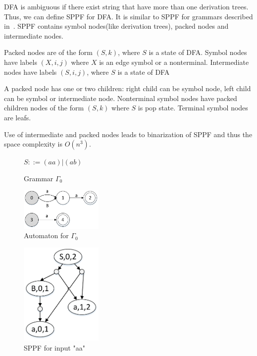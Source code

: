 \documentclass[runningheads,a4paper]{llncs}
\begin{document}
DFA is ambiguous if there exist string that have more than one derivation trees. Thus, we can define SPPF for DFA. 
It is similar to SPPF for grammars described in~\cite{scott2013gll}. SPPF contains symbol nodes(like derivation trees), packed nodes
and intermediate nodes. 

Packed nodes are of the form $(S, k)$, where $S$ is a state of DFA. 
Symbol nodes have labels $(X, i, j)$ where $X$ is an edge symbol or a nonterminal. 
Intermediate nodes have labels $ (S, i, j) $, where $S$ is a state of DFA

A packed node has one or two children: right child can be symbol node, left child can be symbol or intermediate node.   
Nonterminal symbol nodes have packed children nodes of the form $(S, k)$ where $S$ is pop state. 
Terminal symbol nodes are leafs.

Use of intermediate and packed nodes leads to binarization of SPPF and thus the space complexity is $O(n^{3})$.

\begin{figure}
    \centering
    \parbox{2.9cm}{
        \begin{center}
            $S ::= (aa)|(ab)$
        \end{center}
        \caption{Grammar $\Gamma_{0}$}
        \label{fig:grammarG0}}
    \qquad
    \begin{minipage}{4cm}
        \includegraphics[width=4cm]{pictures/automatonForG0.pdf}
        \caption{Automaton for $\Gamma_{0}$}
        \label{fig:automatonForG0}
    \end{minipage}
\end{figure}

\begin{figure}
    \centering
    \includegraphics[width=4cm]{pictures/SPPFforG0.pdf}
    \caption{SPPF for input "aa"}
    \label{fig:SPPF}
\end{figure}
\end{document}
